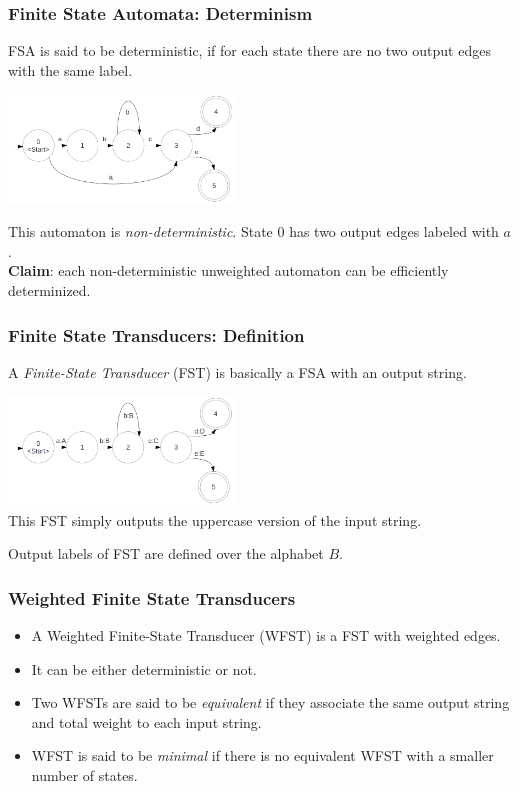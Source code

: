 \documentclass{beamer}
\newcommand{\<}{\langle}
\renewcommand{\>}{\rangle}
\begin{document}
\begin{frame}
  \frametitle{Finite State Automata: Determinism}

FSA is said to be deterministic, if for each state there are no two output edges with the same label.
\begin{center}
\includegraphics[width=6cm]{fsa-determination-3.png}\\
\end{center}
This automaton is \textit{non-deterministic}. State 0 has two output edges labeled with $a$.\\
\textbf{Claim}: each non-deterministic unweighted automaton can be efficiently determinized.
\end{frame}
\begin{frame}
  \frametitle{Finite State Transducers: Definition}

A \textit{Finite-State Transducer} (FST) is basically a FSA with an output string.
\begin{center}
\includegraphics[width=6cm]{fst-example-4.png}\\
This FST simply outputs the uppercase version of the input string.
\end{center}
Output labels of FST are defined over the alphabet $B$.
\end{frame}
\begin{frame}
  \frametitle{Weighted Finite State Transducers}
\begin{itemize}
\item A Weighted Finite-State Transducer (WFST) is a FST with weighted edges.
\item It can be either deterministic or not.
\item Two WFSTs are said to be \textit{equivalent} if they associate the same output string and total weight to each input string.
\item WFST is said to be \textit{minimal} if there is no equivalent WFST with a smaller number of states.
\end{itemize}
\end{frame}
\end{document}
